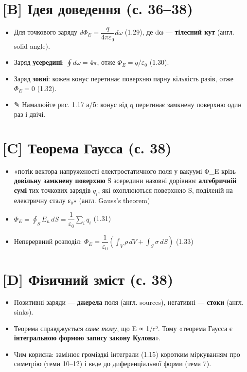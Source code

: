 \documentclass[11pt,a4paper,oneside]{book}
\newcommand{\pen}{{\sffamily\color{accent}✎}}
\begin{document}
\section*{[B] Ідея доведення (с. 36–38)}
\begin{itemize}
\item Для точкового заряду $d\Phi_E = \dfrac{q}{4\pi\varepsilon_0}d\omega$ (1.29), де dω — \textbf{тілесний кут} (англ. solid angle).
\item Заряд \textbf{усередині}: $\oint d\omega = 4\pi$, отже $\Phi_E = q/\varepsilon_0$ (1.30).
\item Заряд \textbf{зовні}: кожен конус перетинає поверхню парну кількість разів, отже $\Phi_E = 0$ (1.32).
\item \pen{} Намалюйте рис. 1.17 а/б: конус від q перетинає замкнену поверхню один раз і двічі.
\end{itemize}

\section*{[C] Теорема Гаусса (с. 38)}
\begin{itemize}
\item «потік вектора напруженості електростатичного поля у вакуумі Φ\_E крізь \textbf{довільну замкнену поверхню} S зсередини назовні дорівнює \textbf{алгебричній сумі} тих точкових зарядів $q_{i}$, які охоплюються поверхнею S, поділеній на електричну сталу ε₀» (англ. Gauss's theorem)
\item $\Phi_E = \oint_S E_n\,dS = \dfrac{1}{\varepsilon_0}\sum_i q_i$ (1.31)
\item Неперервний розподіл: $\Phi_E = \dfrac{1}{\varepsilon_0}\left(\int_V\rho\,dV + \int_S\sigma\,dS\right)$ (1.33)
\end{itemize}

\section*{[D] Фізичний зміст (с. 38)}
\begin{itemize}
\item Позитивні заряди — \textbf{джерела} поля (англ. sources), негативні — \textbf{стоки} (англ. sinks).
\item Теорема справджується \textit{саме тому}, що E ∝ 1/r². Тому «теорема Гаусса є \textbf{інтегральною формою запису закону Кулона}».
\item Чим корисна: замінює громіздкі інтеграли (1.15) коротким міркуванням про симетрію (теми 10–12) і веде до диференціальної форми (тема 7).
\end{itemize}
\end{document}
